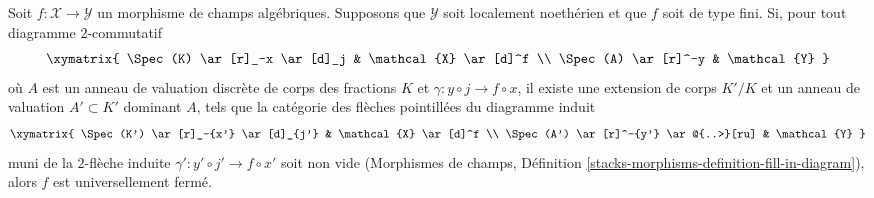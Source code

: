 \begin{lemma}
\label{lemma-valuative-criterion-universally-closed}
Soit $f : \mathcal{X} \to \mathcal{Y}$ un morphisme de champs algébriques.
Supposons que $\mathcal{Y}$ soit localement noethérien et que $f$ soit de type fini.
Si, pour tout diagramme $2$-commutatif
$$
\xymatrix{
\Spec(K) \ar[r]_-x \ar[d]_j & \mathcal{X} \ar[d]^f \\
\Spec(A) \ar[r]^-y & \mathcal{Y}
}
$$
où $A$ est un anneau de valuation discrète de corps des fractions $K$
et $\gamma : y \circ j \to f \circ x$, il existe une extension de corps $K'/K$
et un anneau de valuation $A' \subset K'$ dominant $A$, tels que
la catégorie des flèches pointillées du diagramme induit
$$
\xymatrix{
\Spec(K') \ar[r]_-{x'} \ar[d]_{j'} & \mathcal{X} \ar[d]^f \\
\Spec(A') \ar[r]^-{y'} \ar@{..>}[ru] & \mathcal{Y}
}
$$
muni de la $2$-flèche induite $\gamma' : y' \circ j' \to f \circ x'$
soit non vide (Morphismes de champs, Définition
\ref{stacks-morphisms-definition-fill-in-diagram}), alors $f$ est
universellement fermé.
\end{lemma}

